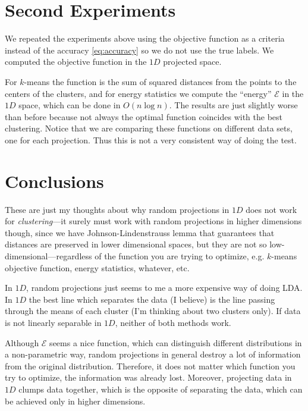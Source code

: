\documentclass[aps,preprint,nofootinbib,floatfix]{revtex4-1}
\begin{document}
\section{Second Experiments}

We repeated the experiments above using the objective function as a criteria
instead of the accuracy \eqref{eq:accuracy} so we do not use the true labels.
We computed the objective function in the $1D$ projected space. 

For $k$-means
the function is the sum of squared distances from the points 
to the centers of the clusters,
and for energy statistics we compute the ``energy'' $\mathcal{E}$ in the
$1D$ space, which can be done in $O(n \log n)$. The results are just slightly
worse than before because not always the optimal function coincides with
the best clustering. Notice that we are comparing these functions on 
different data sets, one for each projection. Thus this is not a very
consistent way of doing the test.


\section{Conclusions}

These are just my thoughts about why random projections in $1D$ 
does not work
for \emph{clustering}---it surely
must work with random projections in higher dimensions though, since
we have Johnson-Lindenstrauss lemma that guarantees that distances
are preserved in lower dimensional spaces, but they are not so 
low-dimensional---regardless of 
the function you are trying to optimize,
e.g. $k$-means objective function, energy statistics, whatever, etc.

In $1D$, random projections just seems to me a more expensive way of doing
LDA. In $1D$ the best line which separates the data (I believe) is the line
passing through the means of each cluster (I'm thinking about two clusters
only). If data is not linearly separable
in $1D$, neither of both methods work.

Although $\mathcal{E}$ seems a nice function, which can distinguish different
distributions in a non-parametric way, random projections in general destroy
a lot of information from the original distribution. Therefore, it does not
matter which function you try to optimize, the information was already lost.
Moreover, projecting data in $1D$ clumps data together, which is the opposite
of separating the data, which can be achieved only in higher dimensions.
\end{document}
